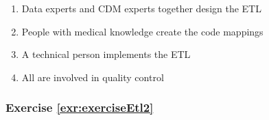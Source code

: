 \documentclass[11pt]{book}
\providecommand{\tightlist}{%
  \setlength{\itemsep}{0pt}\setlength{\parskip}{0pt}}
\theoremstyle{definition}
\theoremstyle{definition}
\theoremstyle{definition}
\theoremstyle{remark}
\begin{document}
\begin{enumerate}
\def\labelenumi{\Alph{enumi})}
\tightlist
\item
  Data experts and CDM experts together design the ETL
\item
  People with medical knowledge create the code mappings
\item
  A technical person implements the ETL
\item
  All are involved in quality control
\end{enumerate}

\subsubsection*{Exercise
\ref{exr:exerciseEtl2}}\label{exercise-refexrexerciseetl2}
\end{document}
